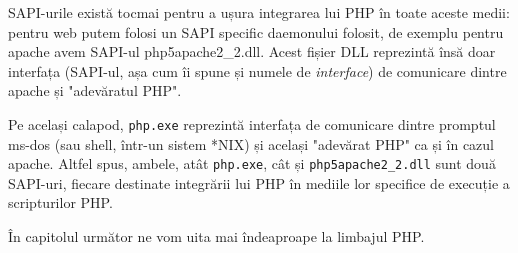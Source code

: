 SAPI-urile există tocmai pentru a ușura integrarea lui PHP în toate aceste medii: pentru web putem folosi
un SAPI specific daemonului folosit, de exemplu pentru apache avem SAPI-ul php5apache2\_2.dll.
Acest fișier DLL reprezintă însă doar interfața (SAPI-ul, așa cum îi spune și numele de \textsl{interface})
de comunicare dintre apache și "adevăratul PHP".

Pe același calapod, \texttt{php.exe} reprezintă interfața de comunicare dintre promptul ms-dos
(sau shell, într-un sistem *NIX) și același "adevărat PHP" ca și în cazul apache. Altfel spus,
ambele, atât \texttt{php.exe}, cât și \texttt{php5apache2\_2.dll} sunt două SAPI-uri,
fiecare destinate integrării lui PHP în mediile lor specifice de execuție a scripturilor PHP.

În capitolul următor ne vom uita mai îndeaproape la limbajul PHP.
